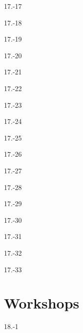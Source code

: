 \begin{exsol@solution}{17.-17}
\end{exsol@solution}
\begin{exsol@solution}{17.-18}
\end{exsol@solution}
\begin{exsol@solution}{17.-19}
\end{exsol@solution}
\begin{exsol@solution}{17.-20}
\end{exsol@solution}
\begin{exsol@solution}{17.-21}
\end{exsol@solution}
\begin{exsol@solution}{17.-22}
\end{exsol@solution}
\begin{exsol@solution}{17.-23}
\end{exsol@solution}
\begin{exsol@solution}{17.-24}
\end{exsol@solution}
\begin{exsol@solution}{17.-25}
\end{exsol@solution}
\begin{exsol@solution}{17.-26}
\end{exsol@solution}
\begin{exsol@solution}{17.-27}
\end{exsol@solution}
\begin{exsol@solution}{17.-28}

\end{exsol@solution}
\begin{exsol@solution}{17.-29}
\end{exsol@solution}
\begin{exsol@solution}{17.-30}
\end{exsol@solution}
\begin{exsol@solution}{17.-31}
\end{exsol@solution}
\begin{exsol@solution}{17.-32}
\end{exsol@solution}
\begin{exsol@solution}{17.-33}


\end{exsol@solution}
\setcounter{chapter}{17}\chapter{Workshops}
\begin{exsol@solution}{18.-1}
\end{exsol@solution}
